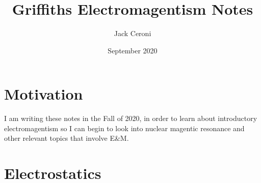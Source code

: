 \documentclass[10pt, oneside]{article}
\title{Griffiths Electromagentism Notes}
\author{Jack Ceroni}
\date{September 2020}
\begin{document}
\maketitle
\tableofcontents

\vspace{.25in}

\section{Motivation}

I am writing these notes in the Fall of 2020, in order to learn about introductory electromagentism so I can begin to 
look into nuclear magentic resonance and other relevant topics that involve E\&M.

\section{Electrostatics}
\end{document}
